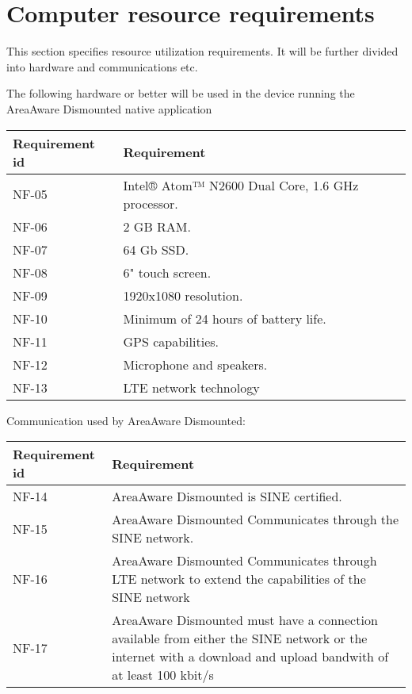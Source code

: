 \label{sec_nonFunc4}
\section{Computer resource requirements}
This section specifies resource utilization requirements. It will be further divided into hardware and communications etc.

The following hardware or better will be used in the device running the AreaAware Dismounted native application
\begin{longtable}{| p{3.2cm} |  p{10cm} | }
	\hline
	\textbf{Requirement id} &  \textbf{Requirement} \\
	\hline
	NF-05 & Intel® Atom™ N2600 Dual Core, 1.6 GHz processor. \\
	\hline
	NF-06 & 2 GB RAM. \\
	\hline
	NF-07 & 64 Gb SSD. \\
	\hline
	NF-08 & 6" touch screen. \\
	\hline
	NF-09 & 1920x1080 resolution. \\
	\hline
	NF-10 & Minimum of 24 hours of battery life. \\
	\hline
	NF-11 & GPS capabilities. \\
	\hline
	NF-12 & Microphone and speakers. \\
	\hline
	NF-13 & LTE network technology  \\
	\hline
\end{longtable}

Communication used by AreaAware Dismounted:
\begin{longtable}{| p{3.2cm} |  p{10cm} | }
	\hline
	\textbf{Requirement id} &  \textbf{Requirement} \\
	\hline
	NF-14 & AreaAware Dismounted is SINE certified.  \\
	\hline
	NF-15 & AreaAware Dismounted Communicates through the SINE network. \\
	\hline
	NF-16 & AreaAware Dismounted Communicates through LTE network to extend the capabilities of the SINE network \\
	\hline
	NF-17 & AreaAware Dismounted must have a connection available from either the SINE network or the internet with a download and upload bandwith of at least 100 kbit/s \\
	\hline
\end{longtable}




